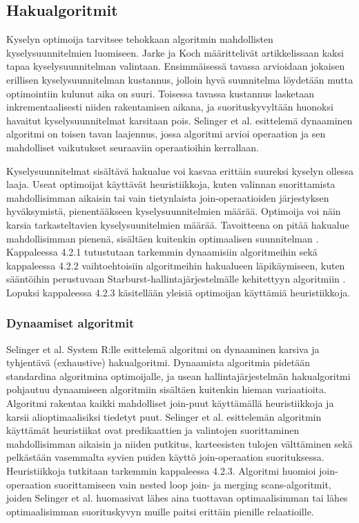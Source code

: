 \documentclass[finnish]{tktltiki2}
\theoremstyle{definition}
\theoremstyle{remark}
\begin{document}
\subsection{Hakualgoritmit}
Kyselyn optimoija tarvitsee tehokkaan algoritmin mahdollisten kyselysuunnitelmien luomiseen. Jarke ja Koch määrittelivät artikkelissaan \cite{jarke1984} kaksi tapaa kyselysuunnitelman valintaan. Ensimmäisessä tavassa arvioidaan jokaisen erillisen kyselysuunnitelman kustannus, jolloin hyvä suunnitelma löydetään mutta optimointiin kulunut aika on suuri. Toisessa tavassa kustannus lasketaan inkrementaalisesti niiden rakentamisen aikana, ja suorituskyvyltään huonoksi havaitut kyselysuunnitelmat karsitaan pois. Selinger et al. esittelemä dynaaminen algoritmi \cite{selinger1979access} on toisen tavan laajennus, jossa algoritmi arvioi operaation ja sen mahdolliset vaikutukset seuraaviin operaatioihin kerrallaan. 

Kyselysuunnitelmat sisältävä hakualue voi kasvaa erittäin suureksi kyselyn ollessa laaja. Useat optimoijat käyttävät heuristiikkoja, kuten valinnan suorittamista mahdollisimman aikaisin tai vain tietynlaista join-operaatioiden järjestyksen hyväksymistä, pienentääkseen kyselysuunnitelmien määrää. Optimoija voi näin karsia tarkasteltavien kyselysuunitelmien määrää. Tavoitteena on pitää hakualue mahdollisimman pienenä, sisältäen kuitenkin optimaalisen suunnitelman \cite{jarke1984}. Kappaleessa 4.2.1 tutustutaan tarkemmin dynaamisiin algoritmeihin sekä kappaleessa 4.2.2 vaihtoehtoisiin algoritmeihin hakualueen läpikäymiseen, kuten sääntöihin perustuvaan Starburst-hallintajärjestelmälle kehitettyyn algoritmiin \cite{lohman1988grammar}. Lopuksi kappaleessa 4.2.3 käsitellään yleisiä optimoijan käyttämiä heuristiikkoja.

\subsubsection{Dynaamiset algoritmit}
Selinger et al. System R:lle esittelemä algoritmi on dynaaminen karsiva ja tyhjentävä (exhaustive) hakualgoritmi. Dynaamista algoritmia pidetään standardina algoritmina optimoijalle, ja usean hallintajärjestelmän hakualgoritmi pohjautuu dynaamiseen algoritmiin sisältäen kuitenkin hieman variaatioita. Algoritmi rakentaa kaikki mahdolliset join-puut käyttämällä heuristiikkoja ja karsii alioptimaalisiksi tiedetyt puut. Selinger et al. esittelemän algoritmin käyttämät heuristiikat ovat predikaattien ja valintojen suorittaminen mahdollisimman aikaisin ja niiden putkitus, karteesisten tulojen välttäminen sekä pelkästään vasemmalta syvien puiden käyttö join-operaation suorituksessa. Heuristiikkoja tutkitaan tarkemmin kappaleessa 4.2.3. Algoritmi huomioi join-operaation suorittamiseen vain nested loop join- ja merging scans-algoritmit, joiden Selinger et al. huomasivat lähes aina tuottavan optimaalisimman tai lähes optimaalisimman suorituskyvyn muille paitsi erittäin pienille relaatioille.
\end{document}
